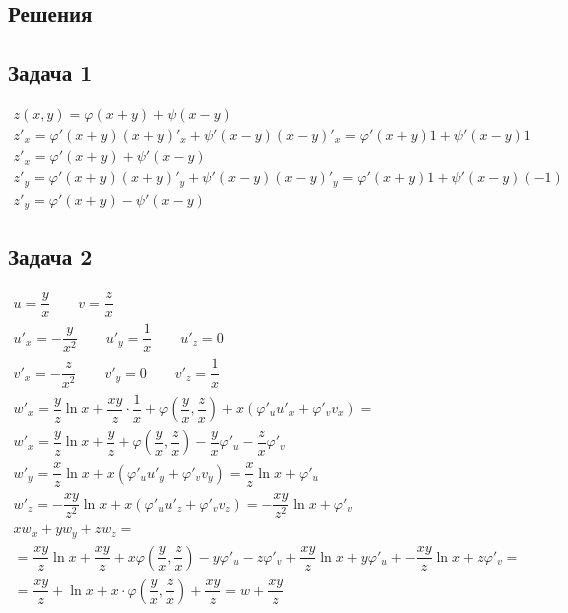 \documentclass[a4paper,fleqn,12pt]{article}
\theoremstyle{definition}
\begin{document}
\newpage
\subsection{Решения}

\subsection*{Задача 1}
\begin{gather*}
z(x,y) = \varphi(x+y) + \psi(x-y) \\
z'_x = \varphi'(x+y)(x+y)'_x + \psi'(x-y)(x-y)'_x  = \varphi'(x+y)1 + \psi'(x-y)1\\
z'_x = \varphi'(x+y) + \psi'(x-y)\\
z'_y = \varphi'(x+y)(x+y)'_y + \psi'(x-y)(x-y)'_y = \varphi'(x+y)1 + \psi'(x-y)(-1) \\
z'_y = \varphi'(x+y) - \psi'(x-y)
\end{gather*}

\subsection*{Задача 2}
\begin{gather*}
u = \dfrac{y}{x} \qquad v = \dfrac{z}{x}\\
u'_x = - \dfrac{y}{x^2} \qquad u'_y = \dfrac{1}{x} \qquad u'_z = 0 \\
v'_x = - \dfrac{z}{x^2} \qquad v'_y = 0 \qquad v'_z = \dfrac{1}{x} \\
w'_x = \dfrac{y}{z} \ln{x} + \dfrac{xy}{z} \cdot \dfrac{1}{x} + \varphi \left(\dfrac{y}{x}, \dfrac{z}{x}\right) + x(\varphi'_u u'_x + \varphi'_v v_x) =\\
w'_x =\dfrac{y}{z} \ln{x} + \dfrac{y}{z}+ \varphi \left(\dfrac{y}{x}, \dfrac{z}{x}\right) -\dfrac{y}{x}\varphi'_u  - \dfrac{z}{x}\varphi'_v\\
w'_y = \dfrac{x}{z} \ln{x} + x(\varphi'_u u'_y + \varphi'_v v_y) = \dfrac{x}{z} \ln{x} + \varphi'_u \\
w'_z = -\dfrac{xy}{z^2} \ln{x} + x(\varphi'_u u'_z + \varphi'_v v_z) =  -\dfrac{xy}{z^2} \ln{x} + \varphi'_v\\
x w_x + y w_y+z w_z = \\
= \dfrac{xy}{z} \ln{x} + \dfrac{xy}{z}+ x \varphi \left(\dfrac{y}{x}, \dfrac{z}{x}\right) -y\varphi'_u  - z\varphi'_v + \dfrac{xy}{z} \ln{x} + y\varphi'_u + -\dfrac{xy}{z} \ln{x} + z\varphi'_v =\\
= \dfrac{xy}{z} + \ln{x} + x \cdot \varphi \left(\dfrac{y}{x}, \dfrac{z}{x}\right) +\dfrac{xy}{z} = w +\dfrac{xy}{z} 
\end{gather*}
\end{document}
